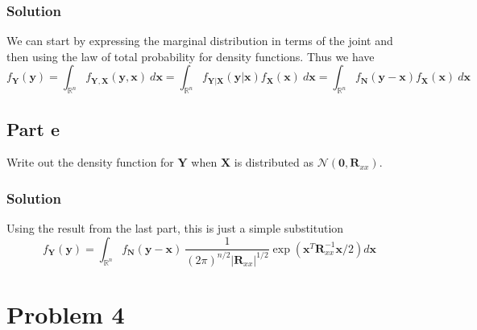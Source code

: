 \documentclass[a4paper]{article}
\begin{document}
\subsubsection*{Solution}%
We can start by expressing the marginal distribution in terms of the joint and then using the law of total probability for density functions. Thus we have
\[
  f_{\mathbf{Y}}(\mathbf{y}) = \int_{\mathds{R}^n} f_{\mathbf{Y}, \mathbf{X}}(\mathbf{y}, \mathbf{x})\ d\mathbf{x} = \int_{\mathds{R}^n} f_{\mathbf{Y}|\mathbf{X}}(\mathbf{y}|\mathbf{x})f_{\mathbf{X}}(\mathbf{x})\ d\mathbf{x} = \int_{\mathds{R}^n} f_{\mathbf{N}}(\mathbf{y} - \mathbf{x})f_{\mathbf{X}}(\mathbf{x})\ d\mathbf{x}
\]

\subsection*{Part e}%
Write out the density function for $\mathbf{Y}$ when $\mathbf{X}$ is distributed as $\mathcal{N}(\mathbf{0}, \mathbf{R}_{xx})$.

\subsubsection*{Solution}%
Using the result from the last part, this is just a simple substitution
\[
  f_{\mathbf{Y}}(\mathbf{y}) = \int_{\mathds{R}^n} f_{\mathbf{N}}(\mathbf{y} - \mathbf{x})\ \frac{1}{(2\pi)^{n/2}|\mathbf{R}_{xx}|^{1/2}} \exp\left(\mathbf{x}^T \mathbf{R}_{xx}^{-1}\mathbf{x}/2\right)d\mathbf{x}
\]

\section*{Problem 4}
\end{document}
